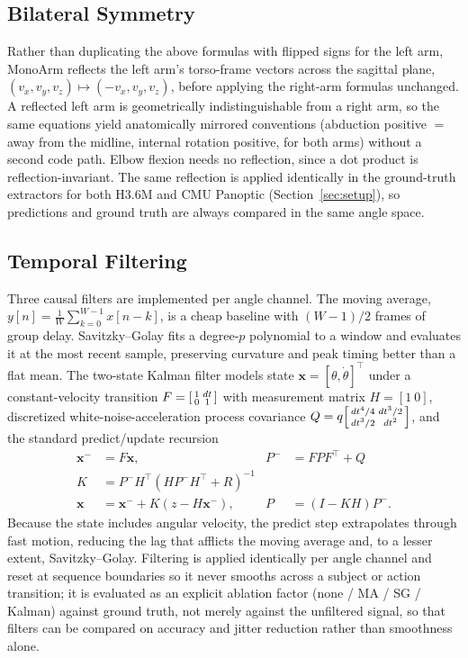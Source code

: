 \documentclass[conference]{IEEEtran}
\begin{document}
\subsection{Bilateral Symmetry}
\label{sec:bilateral}
Rather than duplicating the above formulas with flipped signs for the
left arm, MonoArm reflects the left arm's torso-frame vectors across the
sagittal plane, $(v_x,v_y,v_z)\mapsto(-v_x,v_y,v_z)$, before applying the
right-arm formulas unchanged. A reflected left arm is geometrically
indistinguishable from a right arm, so the same equations yield
anatomically mirrored conventions (abduction positive $=$ away from the
midline, internal rotation positive, for both arms) without a second
code path. Elbow flexion needs no reflection, since a dot product is
reflection-invariant. The same reflection is applied identically in the
ground-truth extractors for both H3.6M and CMU Panoptic
(Section~\ref{sec:setup}), so predictions and ground truth are always
compared in the same angle space.

\subsection{Temporal Filtering}
\label{sec:filtering}
Three causal filters are implemented per angle channel. The moving
average, $y[n]=\frac1W\sum_{k=0}^{W-1}x[n-k]$, is a cheap baseline with
$(W\!-\!1)/2$ frames of group delay. Savitzky--Golay
\cite{savitzky1964smoothing} fits a degree-$p$ polynomial to a window
and evaluates it at the most recent sample, preserving curvature and
peak timing better than a flat mean. The two-state Kalman filter models
state $\mathbf{x}=[\theta,\dot\theta]^{\!\top}$ under a constant-velocity
transition $F=\begin{bsmallmatrix}1&dt\\0&1\end{bsmallmatrix}$ with
measurement matrix $H=[1\ 0]$, discretized white-noise-acceleration
process covariance
$Q = q\begin{bsmallmatrix}dt^4/4 & dt^3/2\\ dt^3/2 & dt^2\end{bsmallmatrix}$,
and the standard predict/update recursion
\begin{align}
\mathbf{x}^- &= F\mathbf{x}, & P^- &= FPF^{\!\top}+Q \\
K &= P^-H^{\!\top}(HP^-H^{\!\top}+R)^{-1} \\
\mathbf{x} &= \mathbf{x}^- + K(z-H\mathbf{x}^-), & P &= (I-KH)P^-.
\end{align}
Because the state includes angular velocity, the predict step
extrapolates through fast motion, reducing the lag that afflicts the
moving average and, to a lesser extent, Savitzky--Golay. Filtering is
applied identically per angle channel and reset at sequence boundaries
so it never smooths across a subject or action transition; it is
evaluated as an explicit ablation factor (none / MA / SG / Kalman)
against ground truth, not merely against the unfiltered signal, so that
filters can be compared on accuracy and jitter reduction rather than
smoothness alone.
\end{document}
